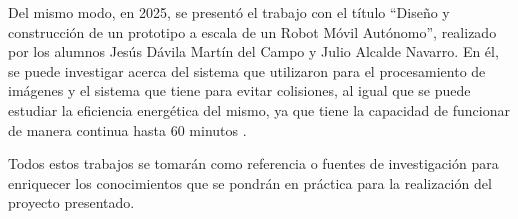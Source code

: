 Del mismo modo, en 2025, se presentó el trabajo con el título “Diseño y construcción de un prototipo a escala de un Robot Móvil Autónomo”, realizado por los alumnos Jesús Dávila Martín del Campo y Julio Alcalde Navarro. En él, se puede investigar acerca del sistema que utilizaron para el procesamiento de imágenes y el sistema que tiene para evitar colisiones, al igual que se puede estudiar la eficiencia energética del mismo, ya que tiene la capacidad de funcionar de manera continua hasta 60 minutos \cite{A3}.

Todos estos trabajos se tomarán como referencia o fuentes de investigación para enriquecer los conocimientos que se pondrán en práctica para la realización del proyecto presentado.